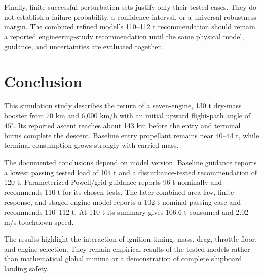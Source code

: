 \documentclass[11pt,a4paper]{article}
\begin{document}
Finally, finite successful perturbation sets justify only their tested cases. They do not establish a failure probability, a confidence interval, or a universal robustness margin. The combined refined model's 110--112 t recommendation should remain a reported engineering-study recommendation until the same physical model, guidance, and uncertainties are evaluated together.

\section{Conclusion}
This simulation study describes the return of a seven-engine, 130 t dry-mass booster from 70 km and 6,000 km/h with an initial upward flight-path angle of $45^\circ$. Its reported ascent reaches about 143 km before the entry and terminal burns complete the descent. Baseline entry propellant remains near 40--44 t, while terminal consumption grows strongly with carried mass.

The documented conclusions depend on model version. Baseline guidance reports a lowest passing tested load of 104 t and a disturbance-tested recommendation of 120 t. Parameterized Powell/grid guidance reports 96 t nominally and recommends 110 t for its chosen tests. The later combined area-law, finite-response, and staged-engine model reports a 102 t nominal passing case and recommends 110--112 t. At 110 t its summary gives 106.6 t consumed and 2.02 m/s touchdown speed.

The results highlight the interaction of ignition timing, mass, drag, throttle floor, and engine selection. They remain empirical results of the tested models rather than mathematical global minima or a demonstration of complete shipboard landing safety.
\end{document}
